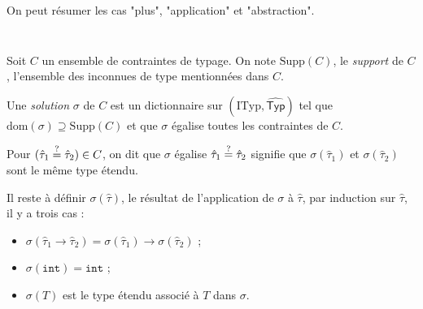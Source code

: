 \documentclass[../main]{subfiles}
\begin{document}
  \begin{rmk}
    On peut résumer les cas "plus", "application" et "abstraction".
    \begin{figure}[H]
      \centering
      $\quad$
      $\quad$
    \end{figure}
  \end{rmk}

  \begin{defn}
    Soit $C$ un ensemble de contraintes de typage. On note $\mathrm{Supp}(C)$, le \textit{support} de $C$, l'ensemble des inconnues de type mentionnées dans $C$.

    Une \textit{solution} $\sigma$ de $C$ est un dictionnaire sur $(\mathrm{ITyp}, \widehat{\mathsf{Typ}})$ tel que~$\mathrm{dom}(\sigma) \supseteq \mathrm{Supp}(C)$ et que $\sigma$ égalise toutes les contraintes de $C$.

    Pour $(\hat{\tau}_1 \mathrel{\overset ? =} \hat{\tau}_2) \in C$, on dit que $\sigma$ égalise $\hat{\tau}_1 \mathrel{\overset ? =} \hat{\tau}_2$ signifie que $\sigma(\hat{\tau}_1)$ et $\sigma(\hat{\tau}_2)$ sont le même type étendu.

    Il reste à définir $\sigma(\hat{\tau})$, le résultat de l'application de $\sigma$ à $\hat{\tau}$, par induction sur $\hat{\tau}$, il y a trois cas :
    \begin{itemize}
      \item $\sigma(\hat{\tau}_1 \to \hat{\tau}_2) = \sigma(\hat{\tau}_1) \to \sigma(\hat{\tau}_2)$ ;
      \item $\sigma(\mathtt{int}) = \mathtt{int}$ ;
      \item $\sigma(T)$ est le type étendu associé à $T$ dans $\sigma$.
    \end{itemize}
  \end{defn}
\end{document}
